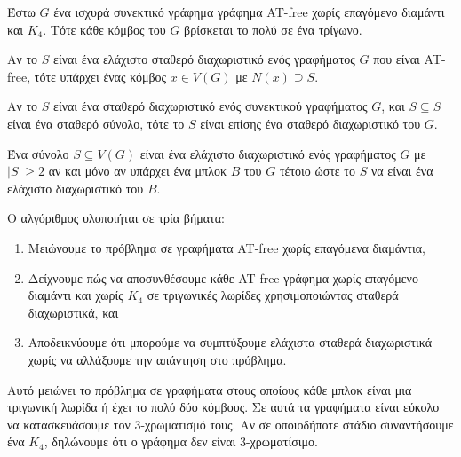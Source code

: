\begin{lemma}
	\label{lemma:4.1}
	Έστω $G$ ένα ισχυρά συνεκτικό γράφημα γράφημα AT-free χωρίς επαγόμενο διαμάντι και $K_4$. Τότε κάθε κόμβος του $G$ βρίσκεται το πολύ σε ένα τρίγωνο.
\end{lemma}

\begin{lemma}
	\label{lemma:6.1}
	Αν το $S$ είναι ένα ελάχιστο σταθερό διαχωριστικό ενός γραφήματος $G$ που είναι AT-free, τότε υπάρχει ένας κόμβος $x \in V(G)$ με $N(x) \supseteq S$.
\end{lemma}


\begin{lemma}
	\label{lemma:6.2}
	Αν το $S$ είναι ένα σταθερό διαχωριστικό ενός συνεκτικού γραφήματος $G$, και $S \subseteq S$ είναι ένα σταθερό σύνολο, τότε το $S$ είναι επίσης ένα σταθερό διαχωριστικό του $G$.
\end{lemma}


\begin{lemma}
	\label{lemma:6.3}
	Ένα σύνολο $S \subseteq V(G)$ είναι ένα ελάχιστο διαχωριστικό ενός γραφήματος $G$ με $|S| \geq 2$ αν και μόνο αν υπάρχει ένα μπλοκ $B$ του $G$ τέτοιο ώστε το $S$ να είναι ένα ελάχιστο διαχωριστικό του $B$.
\end{lemma}


Ο αλγόριθμος υλοποιήται σε τρία βήματα:
\begin{enumerate}
	\item Μειώνουμε το πρόβλημα σε γραφήματα AT-free χωρίς επαγόμενα διαμάντια,
	\item Δείχνουμε πώς να αποσυνθέσουμε κάθε AT-free γράφημα χωρίς επαγόμενο διαμάντι και χωρίς $K_4$ σε τριγωνικές λωρίδες χρησιμοποιώντας σταθερά διαχωριστικά, και
	\item Αποδεικνύουμε ότι μπορούμε να συμπτύξουμε ελάχιστα σταθερά διαχωριστικά χωρίς να αλλάξουμε την απάντηση στο πρόβλημα.
\end{enumerate}

Αυτό μειώνει το πρόβλημα σε γραφήματα στους οποίους κάθε μπλοκ είναι μια τριγωνική λωρίδα ή έχει το πολύ δύο κόμβους. Σε αυτά τα γραφήματα είναι εύκολο να κατασκευάσουμε τον 3-χρωματισμό τους. Αν σε οποιοδήποτε στάδιο συναντήσουμε ένα $K_4$, δηλώνουμε ότι ο γράφημα δεν είναι $3$-χρωματίσιμο.

